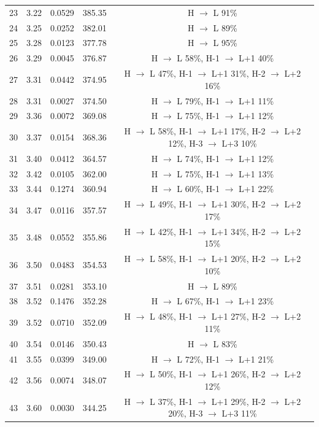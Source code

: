 \begin{table}[H]
{\begin{center}
\begin{tabular}{ccccc}
23 & 3.22 & 0.0529 & 385.35 & H $\rightarrow$ L 91\% \\
24 & 3.25 & 0.0252 & 382.01 & H $\rightarrow$ L 89\% \\
25 & 3.28 & 0.0123 & 377.78 & H $\rightarrow$ L 95\% \\
26 & 3.29 & 0.0045 & 376.87 & H $\rightarrow$ L 58\%, H-1 $\rightarrow$ L+1 40\% \\
27 & 3.31 & 0.0442 & 374.95 & H $\rightarrow$ L 47\%, H-1 $\rightarrow$ L+1 31\%, H-2 $\rightarrow$ L+2 16\% \\
28 & 3.31 & 0.0027 & 374.50 & H $\rightarrow$ L 79\%, H-1 $\rightarrow$ L+1 11\% \\
29 & 3.36 & 0.0072 & 369.08 & H $\rightarrow$ L 75\%, H-1 $\rightarrow$ L+1 12\% \\
30 & 3.37 & 0.0154 & 368.36 & H $\rightarrow$ L 58\%, H-1 $\rightarrow$ L+1 17\%, H-2 $\rightarrow$ L+2 12\%, H-3 $\rightarrow$ L+3 10\% \\
31 & 3.40 & 0.0412 & 364.57 & H $\rightarrow$ L 74\%, H-1 $\rightarrow$ L+1 12\% \\
32 & 3.42 & 0.0105 & 362.00 & H $\rightarrow$ L 75\%, H-1 $\rightarrow$ L+1 13\% \\
33 & 3.44 & 0.1274 & 360.94 & H $\rightarrow$ L 60\%, H-1 $\rightarrow$ L+1 22\% \\
34 & 3.47 & 0.0116 & 357.57 & H $\rightarrow$ L 49\%, H-1 $\rightarrow$ L+1 30\%, H-2 $\rightarrow$ L+2 17\% \\
35 & 3.48 & 0.0552 & 355.86 & H $\rightarrow$ L 42\%, H-1 $\rightarrow$ L+1 34\%, H-2 $\rightarrow$ L+2 15\% \\
36 & 3.50 & 0.0483 & 354.53 & H $\rightarrow$ L 58\%, H-1 $\rightarrow$ L+1 20\%, H-2 $\rightarrow$ L+2 10\% \\
37 & 3.51 & 0.0281 & 353.10 & H $\rightarrow$ L 89\% \\
38 & 3.52 & 0.1476 & 352.28 & H $\rightarrow$ L 67\%, H-1 $\rightarrow$ L+1 23\% \\
39 & 3.52 & 0.0710 & 352.09 & H $\rightarrow$ L 48\%, H-1 $\rightarrow$ L+1 27\%, H-2 $\rightarrow$ L+2 11\% \\
40 & 3.54 & 0.0146 & 350.43 & H $\rightarrow$ L 83\% \\
41 & 3.55 & 0.0399 & 349.00 & H $\rightarrow$ L 72\%, H-1 $\rightarrow$ L+1 21\% \\
42 & 3.56 & 0.0074 & 348.07 & H $\rightarrow$ L 50\%, H-1 $\rightarrow$ L+1 26\%, H-2 $\rightarrow$ L+2 12\% \\
43 & 3.60 & 0.0030 & 344.25 & H $\rightarrow$ L 37\%, H-1 $\rightarrow$ L+1 29\%, H-2 $\rightarrow$ L+2 20\%, H-3 $\rightarrow$ L+3 11\% \\

\end{tabular}
\end{center}}
\end{table}
